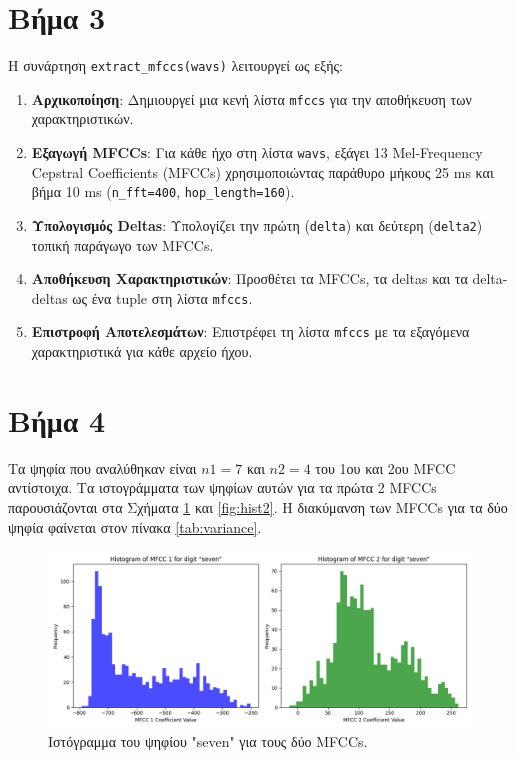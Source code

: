 \documentclass[a4paper,12pt]{article}
\begin{document}
\section*{Βήμα 3}

Η συνάρτηση \texttt{extract\_mfccs(wavs)} λειτουργεί ως εξής:

\begin{enumerate}
    \item \textbf{Αρχικοποίηση}: Δημιουργεί μια κενή λίστα \texttt{mfccs} για την αποθήκευση των χαρακτηριστικών.
    \item \textbf{Εξαγωγή MFCCs}: Για κάθε ήχο στη λίστα \texttt{wavs}, εξάγει 13 Mel-Frequency Cepstral Coefficients (MFCCs) χρησιμοποιώντας παράθυρο μήκους 25 ms και βήμα 10 ms (\texttt{n\_fft=400}, \texttt{hop\_length=160}).
    \item \textbf{Υπολογισμός Deltas}: Υπολογίζει την πρώτη (\texttt{delta}) και δεύτερη (\texttt{delta2}) τοπική παράγωγο των MFCCs.
    \item \textbf{Αποθήκευση Χαρακτηριστικών}: Προσθέτει τα MFCCs, τα deltas και τα delta-deltas ως ένα tuple στη λίστα \texttt{mfccs}.
    \item \textbf{Επιστροφή Αποτελεσμάτων}: Επιστρέφει τη λίστα \texttt{mfccs} με τα εξαγόμενα χαρακτηριστικά για κάθε αρχείο ήχου.
\end{enumerate}

\section*{Βήμα 4}

Τα ψηφία που αναλύθηκαν είναι $n1=7$ και $n2=4$ του 1ου και 2ου MFCC αντίστοιχα. Τα ιστογράμματα των ψηφίων αυτών για τα πρώτα 2 MFCCs παρουσιάζονται στα
Σχήματα \ref{fig:hist1} και \ref{fig:hist2}. Η διακύμανση των MFCCs για τα δύο ψηφία φαίνεται στον πίνακα \ref{tab:variance}.

\begin{figure}[H]
    \centering
    \includegraphics[width=\textwidth]{images/histograms_seven.png}
    \caption{Ιστόγραμμα του ψηφίου "seven" για τους δύο MFCCs.}
    \label{fig:hist1}
\end{figure}
\end{document}
